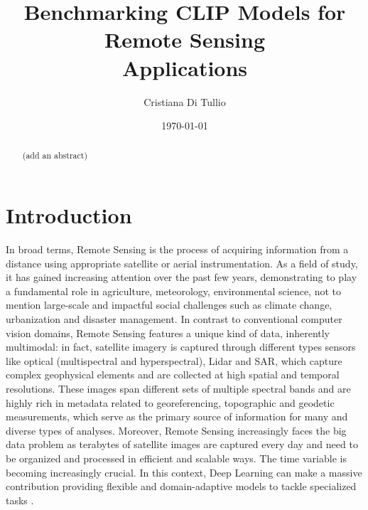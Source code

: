 \documentclass[a4paper, oneside, english]{sapthesis} %
\title{Benchmarking CLIP Models for Remote Sensing \\Applications}
\author{Cristiana Di Tullio}
\date{\today}
\begin{document}
\frontmatter
\maketitle
\dedication{(add a dedication)}

\begin{abstract}
    (add an abstract)
\end{abstract}

\tableofcontents

\mainmatter

\chapter{Introduction} %

In broad terms, Remote Sensing is the process of acquiring information from a distance using appropriate satellite or aerial instrumentation. As a field of study, it has gained increasing attention over the past few years, demonstrating to play a fundamental role in agriculture, meteorology, environmental science, not to mention large-scale and impactful social challenges such as climate change, urbanization and disaster management. In contrast to conventional computer vision domains, Remote Sensing features a unique kind of data, inherently multimodal: in fact, satellite imagery is captured through different types sensors like optical (multispectral and hyperspectral), Lidar and SAR, which capture complex geophysical elements and are collected at high spatial and temporal resolutions. These images span different sets of multiple spectral bands and are highly rich in metadata related to georeferencing, topographic and geodetic measurements, which serve as the primary source of information for many and diverse types of analyses. Moreover, Remote Sensing increasingly faces the big data problem as terabytes of satellite images are captured every day and need to be organized and processed in efficient and scalable ways. The time variable is becoming increasingly crucial. In this context, Deep Learning can make a massive contribution providing flexible and domain-adaptive models to tackle specialized tasks \cite{zhu2017deep}.
\end{document}
